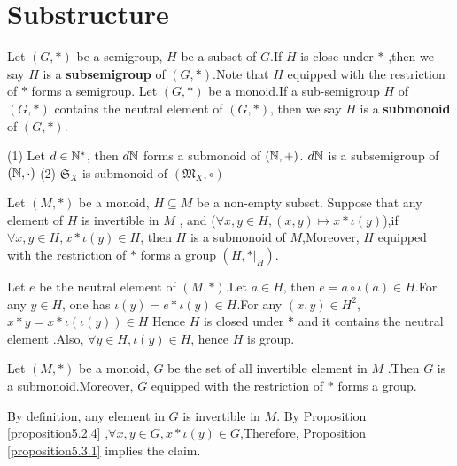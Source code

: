 \documentclass{book}
\numberwithin{equation}{section}
\begin{document}
\section{Substructure}
\begin{definitionenv}
    Let $(G,*)$ be a semigroup, $H$ be a subset of $G$.If $H$ is close under $*$ ,then we say $H$ is a \textbf{subsemigroup} of $(G,*)$.Note that $H$ equipped with the restriction of $*$ forms a semigroup.
    Let $(G,*)$ be a monoid.If a sub-semigroup $H$ of $(G,*)$ contains the neutral element of $(G,*)$, then we say $H$ is a \textbf{submonoid} of $(G,*)$.
\end{definitionenv}
\begin{exampleenv}
   \quad
   \newline
   (1) Let $d\in \mathbb{N}^*$, then $d\mathbb{N}$ forms a submonoid of $(\mathbb{N},+)$.
   \newline
   $d\mathbb{N}$ is a subsemigroup of $(\mathbb{N},\cdot)$
    \newline
    (2) $\mathfrak{S} _X$ is submonoid of $(\mathfrak{M} _X,\circ)$
\end{exampleenv}
\begin{propositionenv}\label{proposition5.3.1}
    Let $(M,*)$ be a monoid, $H\subseteq M$ be a non-empty subset. Suppose that any element of $H$ is invertible in $M$ , and ($\forall x,y \in H,(x,y)\mapsto x*\iota(y)$),if $\forall x,y\in H, x*\iota(y)\in H$, then $H$ is a submonoid of $M$,Moreover, $H$ equipped with the restriction of $*$ forms a group $(H,*|_H)$. 
\end{propositionenv}
\begin{proofenv}
    Let $e$ be the neutral element of $(M,*)$.Let $a\in H$, then $e=a\circ\iota(a)\in H$.For any $y\in H$, one has $\iota(y)=e*\iota(y)\in H$.For any $(x,y)\in H^2$,$x*y=x*\iota(\iota(y))\in H$ Hence $H$ is closed under $*$ and it contains the neutral element .Also, $\forall y\in H, \iota(y)\in H$, hence $H$ is group. 
\end{proofenv}
\begin{corollaryenv}
    Let $(M,*)$ be a monoid, $G$ be the set of all invertible element in $M$ .Then $G$ is a submonoid.Moreover, $G$ equipped with the restriction of $*$ forms a group.
\end{corollaryenv}
\begin{proofenv}
    By definition, any element in $G$ is invertible in $M$. By Proposition \ref{proposition5.2.4} ,$\forall x,y\in G, x*\iota(y)\in G$,Therefore, Proposition \ref{proposition5.3.1} implies the claim.
\end{proofenv}
\end{document}
